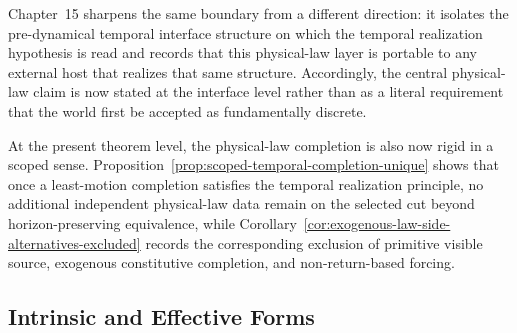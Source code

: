 Chapter~15 sharpens the same boundary from a different direction: it isolates
the pre-dynamical temporal interface structure on which the temporal realization
hypothesis is read and records that this physical-law layer is portable to any
external host that realizes that same structure. Accordingly, the central
physical-law claim is now stated at
the interface level rather than as a literal requirement that the world first
be accepted as fundamentally discrete.

At the present theorem level, the physical-law completion is also now rigid in a
scoped sense. Proposition~\ref{prop:scoped-temporal-completion-unique} shows
that once a least-motion completion satisfies the temporal realization
principle, no additional independent physical-law data remain on the selected
cut beyond horizon-preserving equivalence, while
Corollary~\ref{cor:exogenous-law-side-alternatives-excluded} records the
corresponding exclusion of primitive visible source, exogenous constitutive
completion, and non-return-based forcing.

\subsection{Intrinsic and Effective Forms}

